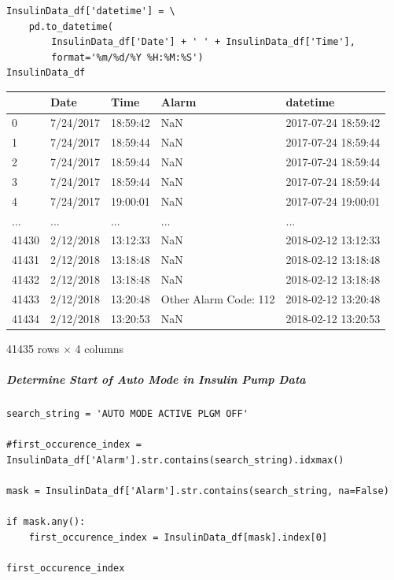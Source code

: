 \bigskip

\begin{verbatim}
InsulinData_df['datetime'] = \
    pd.to_datetime(
        InsulinData_df['Date'] + ' ' + InsulinData_df['Time'], 
        format='%m/%d/%Y %H:%M:%S')
InsulinData_df
\end{verbatim}

\bigskip\noindent
\begin{tabular}{p{}p{}p{}p{}p{}}
\toprule
 & Date & Time & Alarm & datetime \\
\hline
0 & 7/24/2017 & 18:59:42 & NaN & 2017-07-24 18:59:42 \\
\hline
1 & 7/24/2017 & 18:59:44 & NaN & 2017-07-24 18:59:44 \\
\hline
2 & 7/24/2017 & 18:59:44 & NaN & 2017-07-24 18:59:44 \\
\hline
3 & 7/24/2017 & 18:59:44 & NaN & 2017-07-24 18:59:44 \\
\hline
4 & 7/24/2017 & 19:00:01 & NaN & 2017-07-24 19:00:01 \\
\hline
... & ... & ... & ... & ... \\
\hline
41430 & 2/12/2018 & 13:12:33 & NaN & 2018-02-12 13:12:33 \\
\hline
41431 & 2/12/2018 & 13:18:48 & NaN & 2018-02-12 13:18:48 \\
\hline
41432 & 2/12/2018 & 13:18:48 & NaN & 2018-02-12 13:18:48 \\
\hline
41433 & 2/12/2018 & 13:20:48 & Other Alarm Code: 112 & 2018-02-12 13:20:48 \\
\hline
41434 & 2/12/2018 & 13:20:53 & NaN & 2018-02-12 13:20:53 \\
\hline
\bottomrule
\end{tabular}

\bigskip

41435 rows $\times$ 4 columns

\subparagraph{Determine Start of Auto Mode in Insulin Pump Data}

\begin{verbatim}
search_string = 'AUTO MODE ACTIVE PLGM OFF'

#first_occurence_index = InsulinData_df['Alarm'].str.contains(search_string).idxmax()

mask = InsulinData_df['Alarm'].str.contains(search_string, na=False)

if mask.any():
    first_occurence_index = InsulinData_df[mask].index[0]

first_occurence_index
\end{verbatim}

